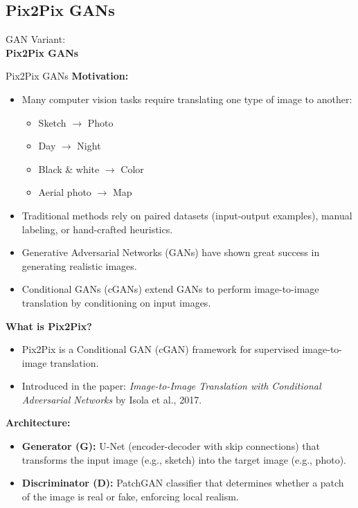 \subsection{Pix2Pix GANs}
\begin{frame}{}
    \LARGE GAN Variant: \\[1.5ex] \textbf{Pix2Pix GANs}
\end{frame}

\begin{frame}[allowframebreaks]{Pix2Pix GANs}
    \textbf{Motivation:}

    \begin{itemize}
        \item Many computer vision tasks require translating one type of image to another:
        \begin{itemize}
            \item Sketch $\rightarrow$ Photo
            \item Day $\rightarrow$ Night
            \item Black \& white $\rightarrow$ Color
            \item Aerial photo $\rightarrow$ Map
        \end{itemize}
        \item Traditional methods rely on paired datasets (input-output examples), manual labeling, or hand-crafted heuristics.
        \item Generative Adversarial Networks (GANs) have shown great success in generating realistic images.
        \item Conditional GANs (cGANs) extend GANs to perform image-to-image translation by conditioning on input images.
    \end{itemize}
\framebreak
    \textbf{What is Pix2Pix?}

    \begin{itemize}
        \item Pix2Pix is a Conditional GAN (cGAN) framework for supervised image-to-image translation.
        \item Introduced in the paper: \textit{Image-to-Image Translation with Conditional Adversarial Networks} by Isola et al., 2017.
    \end{itemize}
\framebreak
    \textbf{Architecture:}
    \begin{itemize}
        \item \textbf{Generator (G):} U-Net (encoder-decoder with skip connections) that transforms the input image (e.g., sketch) into the target image (e.g., photo).
        \item \textbf{Discriminator (D):} PatchGAN classifier that determines whether a patch of the image is real or fake, enforcing local realism.
    \end{itemize}


\end{frame}
